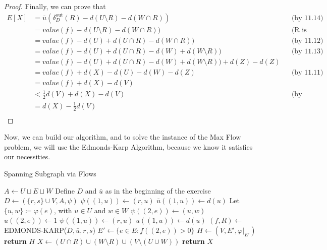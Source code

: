 \documentclass[a4paper,10pt, leqno]{article}
\newcommand{\restr}[1]{|_{#1}}
\theoremstyle{definition}
\begin{document}
\begin{proof}
Finally, we can prove that
\begin{align*}
 E[X] &= \bar{u}(\delta_D^{\text{out}}(R) - d(U \setminus R) - d(W \cap R)) &&\text{(by 11.14)} \\
 &= value(f) - d(U \setminus R) - d(W \cap R)) &&\text{(R is optimal)} \\
 &= value(f) - d(U) + d(U \cap R) - d(W \cap R)) &&\text{(by 11.12)}\\
 &= value(f) - d(U) + d(U \cap R) - d(W) + d(W \setminus R)) &&\text{(by 11.13)}\\ 
 &= value(f) - d(U) + d(U \cap R) - d(W) + d(W \setminus R)) + d(Z) - d(Z)\\ 
 &= value(f) + d(X) - d(U) - d(W) - d(Z) &&\text{(by 11.11)} \\
 &= value(f) + d(X) - d(V) \\
 &< \frac{1}{2}d(V) + d(X) -d(V) &&\text{(by hypothesis)}\\ 
 &= d(X) -\frac{1}{2}d(V) \\  
\end{align*}
\end{proof}

Now, we can build our algorithm, and to solve the instance of the Max Flow problem, we will use the Edmonds-Karp Algorithm, because we know it satisfies our necessities.

\begin{algorithm}{}
\begin{algorithmic}[1]
\caption{Spanning Subgraph via Flows}
\State $A \gets U \sqcup E \sqcup W$ \Comment Define $D$ and $\bar{u}$ as in the beginning of the exercise
\State $D \gets (\{r, s\} \cup V, A, \psi)$
        \State $\psi((1, u)) \gets (r, u)$
        \State $\bar{u}((1, u)) \gets d(u)$
      \EndFor
{}
        \State Let $\{u, w\} \coloneqq \varphi(e)$, with $u \in U$ and $w \in W$
        \State $\psi((2, e)) \gets (u, w)$ 
        \State $\bar{u}((2, e)) \gets 1$
      \EndFor
{}
        \State $\psi((1, u)) \gets (r, u)$
        \State $\bar{u}((1, u)) \gets d(u)$
      \EndFor
\State $(f, R) \gets$ EDMONDS-KARP($D, \bar{u}, r, s$)
\State $E' \gets \{e \in E : f((2, e)) > 0 \}$
\State $H \gets (V, E', \varphi\restr{E'})$
\State \textbf{return} $H$
\Else
\State $X \gets (U \cap R) \cup (W \setminus R) \cup (V \setminus (U \cup W))$ 
\State \textbf{return} $X$ 
\EndIf
\EndProcedure
\end{algorithmic}
\end{algorithm}
\end{document}
